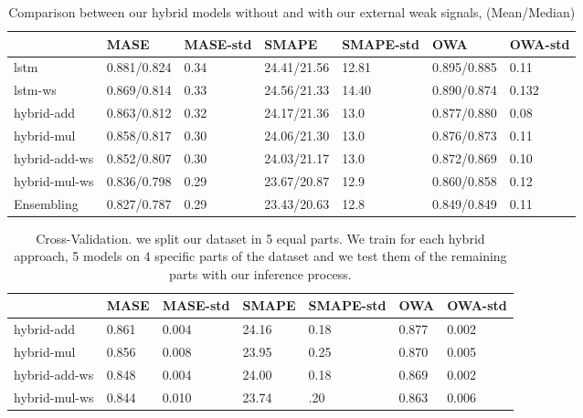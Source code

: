 \documentclass[letterpaper]{article} %
\begin{document}
\begin{table}
  \caption{Comparison between our hybrid models without and with our external weak signals, (Mean/Median)}
  \label{sample-table}
  \centering
  \begin{tabular}{lllllll}
    \toprule
    &  MASE  & MASE-std & SMAPE & SMAPE-std & OWA & OWA-std \\
    \midrule
    lstm & 0.881/0.824 & 0.34 & 24.41/21.56 & 12.81 & 0.895/0.885 & 0.11 \\
    lstm-ws & 0.869/0.814 & 0.33 & 24.56/21.33 & 14.40 & 0.890/0.874 & 0.132 \\
     hybrid-add & 0.863/0.812  & 0.32 & 24.17/21.36 & 13.0 & 0.877/0.880 & 0.08 \\
     hybrid-mul & 0.858/0.817 & 0.30 & 24.06/21.30 & 13.0 & 0.876/0.873 & 0.11 \\
     hybrid-add-ws & 0.852/0.807 & 0.30 & 24.03/21.17 & 13.0 & 0.872/0.869 & 0.10 \\
     hybrid-mul-ws & 0.836/0.798 & 0.29 & 23.67/20.87 & 12.9 & 0.860/0.858 & 0.12 \\
     Ensembling & 0.827/0.787 & 0.29 & 23.43/20.63 & 12.8 & 0.849/0.849 & 0.11\\
    \bottomrule
  \end{tabular}
\end{table}



\begin{table}
  \caption{Cross-Validation. we split our dataset in 5 equal parts. We train for each hybrid approach, 5 models on 4 specific parts of the dataset and we test them of the remaining parts with our inference process.}
  \label{sample-table}
  \centering
  \begin{tabular}{lllllll}
    \toprule
    &  MASE  & MASE-std & SMAPE & SMAPE-std & OWA & OWA-std \\
    \midrule
     hybrid-add & 0.861  & 0.004 & 24.16 & 0.18 & 0.877 & 0.002 \\
     hybrid-mul & 0.856 & 0.008 & 23.95 & 0.25 & 0.870 & 0.005 \\
     hybrid-add-ws & 0.848 & 0.004 & 24.00 & 0.18 & 0.869 & 0.002 \\
     hybrid-mul-ws & 0.844 & 0.010 & 23.74 & .20 & 0.863 & 0.006 \\
    \bottomrule
  \end{tabular}
\end{table}
\end{document}
